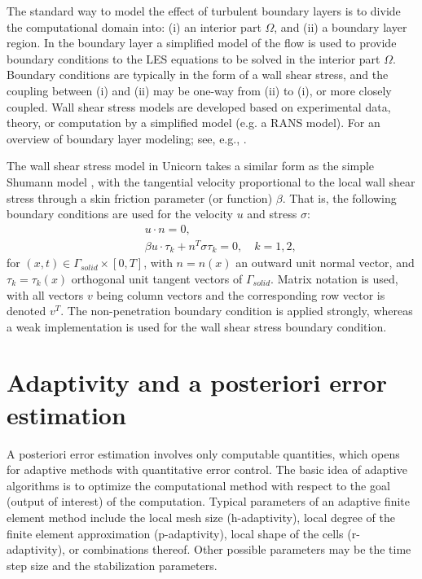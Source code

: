 The standard way to model the effect of turbulent boundary layers is to divide the computational domain into: (i) an interior part $\Omega$, and (ii) a boundary layer region. In the boundary layer a simplified model of the flow is used to provide boundary conditions to the LES equations to be solved in the interior part $\Omega$. Boundary conditions are typically in the form of a wall shear stress, and the coupling between (i) and (ii) may be one-way from (ii) to (i), or more closely coupled. Wall shear stress models are developed based on experimental data, theory, or computation by a simplified model (e.g. a RANS model). For an overview of boundary layer modeling; see, e.g., \citet{SagautDeckTerracol2006,PiomelliBalaras2002}.

The wall shear stress model in Unicorn takes a similar form as the simple Shumann model \citep{Schumann1975}, with the tangential velocity proportional to the local wall shear stress through a skin friction parameter (or function) $\beta$. That is, the following boundary conditions are used for the velocity $u$ and stress $\sigma$:
\begin{eqnarray}
&&u\cdot n=0, \label{slfra} \\
&&\beta u\cdot \tau _k + n^T\sigma \tau _k=0,\quad k=1,2, \label{slfrb}
\end{eqnarray}
for  $(x,t)\in \Gamma_{solid}\times [0,T]$, with $n=n(x)$ an outward unit normal vector, and $\tau_k=\tau_k(x)$ orthogonal unit tangent vectors of $\Gamma_{solid}$. Matrix notation is used, with all vectors $v$ being column vectors and the corresponding row vector is denoted $v^T$. The non-penetration boundary condition is applied strongly, whereas a weak implementation is used for the wall shear stress boundary condition.

\section{Adaptivity and a posteriori error estimation}

A posteriori error estimation involves only computable quantities, which opens for adaptive methods with quantitative error control. The basic idea of adaptive algorithms is to optimize the computational method with respect to the goal (output of interest) of the computation. Typical parameters of an adaptive finite element method include the local mesh size (h-adaptivity), local degree of the finite element approximation (p-adaptivity), local shape of the cells (r-adaptivity), or combinations thereof. Other possible parameters may be the time step size and the stabilization parameters.


